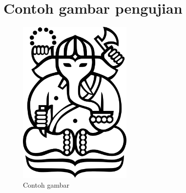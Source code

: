 \chapter{Contoh gambar pengujian}

\begin{figure}[ht]
  \centering
  \includegraphics[width=0.5\textwidth]{resources/cover-ganesha.jpg}
  \caption{Contoh gambar}
\end{figure}